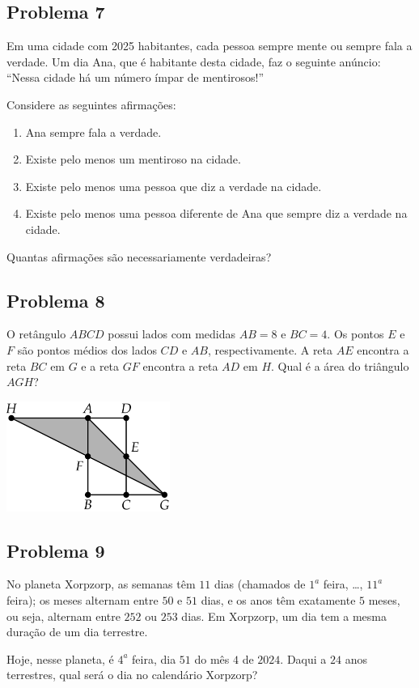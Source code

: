 \documentclass[12pt]{article}
\begin{document}
\subsection{Problema 7}
\begin{tcolorbox}[statementbox]
Em uma cidade com 2025 habitantes, cada pessoa sempre mente ou sempre fala a verdade. Um dia Ana,
          que é habitante desta cidade, faz o seguinte anúncio: “Nessa cidade há um número ímpar de mentirosos!”

          Considere as seguintes afirmações:
          \begin{enumerate}[label={\roman*.}]
            \item Ana sempre fala a verdade.
            \item Existe pelo menos um mentiroso na cidade.
            \item Existe pelo menos uma pessoa que diz a verdade na cidade.
            \item Existe pelo menos uma pessoa diferente de Ana que sempre diz a verdade na cidade.
          \end{enumerate}
          Quantas afirmações são necessariamente verdadeiras?
\end{tcolorbox}

\clearpage

\subsection{Problema 8}
\begin{tcolorbox}[statementbox]
O retângulo $ABCD$ possui lados com medidas $AB = 8$ e $BC = 4$. Os pontos $E$ e $F$ são pontos médios dos
lados $CD$ e $AB$, respectivamente. A reta $AE$ encontra a reta $BC$ em $G$ e a reta $GF$ encontra a reta $AD$ em $H$. Qual
é a área do triângulo $AGH$?
\begin{center}
  \includegraphics[width=0.4\textwidth]{third.png}
\end{center}
\end{tcolorbox}

\clearpage

\subsection{Problema 9}
\begin{tcolorbox}[statementbox]
No planeta Xorpzorp, as semanas têm $11$ dias (chamados de $1^a$ feira, \dots, $11^a$ feira); os meses alternam entre
$50$ e $51$ dias, e os anos têm exatamente $5$ meses, ou seja, alternam entre $252$ ou $253$ dias. Em Xorpzorp, um dia
tem a mesma duração de um dia terrestre.

Hoje, nesse planeta, é $4^a$ feira, dia $51$ do mês $4$ de $2024$. Daqui a $24$ anos terrestres, qual será o dia no calendário
Xorpzorp?
\end{tcolorbox}
\end{document}
